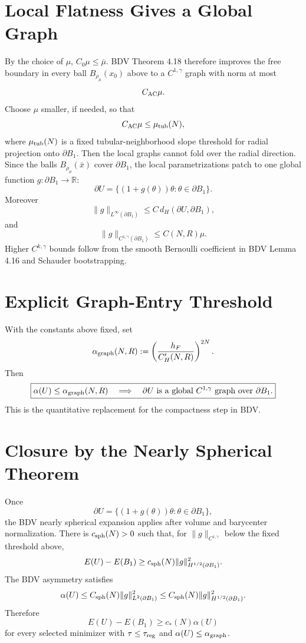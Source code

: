 \documentclass[11pt]{article}
\begin{document}
\section{Local Flatness Gives a Global Graph}

By the choice of \(\mu\), \(C_0\mu\le\bar\mu\). BDV Theorem 4.18 therefore
improves the free boundary in every ball \(B_{\rho_\mu}(x_0)\) above to a
\(C^{1,\gamma}\) graph with norm at most
\[
C_{\rm AC}\mu.
\]
Choose \(\mu\) smaller, if needed, so that
\[
C_{\rm AC}\mu\le \mu_{\rm tub}(N),
\]
where \(\mu_{\rm tub}(N)\) is a fixed tubular-neighborhood slope threshold for
radial projection onto \(\partial B_1\). Then the local graphs cannot fold over
the radial direction. Since the balls \(B_{\rho_\mu}(\bar x)\) cover
\(\partial B_1\), the local parametrizations patch to one global function
\(g:\partial B_1\to\mathbb R\):
\[
\partial U=\{(1+g(\theta))\theta:\theta\in\partial B_1\}.
\]
Moreover
\[
\|g\|_{L^\infty(\partial B_1)}
\le C\,d_H(\partial U,\partial B_1),
\]
and
\[
\|g\|_{C^{1,\gamma}(\partial B_1)}
\le C(N,R)\mu.
\]
Higher \(C^{k,\gamma}\) bounds follow from the smooth Bernoulli coefficient in
BDV Lemma 4.16 and Schauder bootstrapping.

\section{Explicit Graph-Entry Threshold}

With the constants above fixed, set
\[
\alpha_{\rm graph}(N,R)
:=
\left(\frac{h_F}{C_H'(N,R)}\right)^{2N}.
\]
Then
\[
\boxed{
\alpha(U)\le\alpha_{\rm graph}(N,R)
\quad\Longrightarrow\quad
\partial U\hbox{ is a global }C^{1,\gamma}\hbox{ graph over }\partial B_1.
}
\]
This is the quantitative replacement for the compactness step in BDV.

\section{Closure by the Nearly Spherical Theorem}

Once
\[
\partial U=\{(1+g(\theta))\theta:\theta\in\partial B_1\},
\]
the BDV nearly spherical expansion applies after volume and barycenter
normalization. There is \(c_{\rm sph}(N)>0\) such that, for
\(\|g\|_{C^{1,\gamma}}\) below the fixed threshold above,
\[
E(U)-E(B_1)
\ge c_{\rm sph}(N)\|g\|_{H^{1/2}(\partial B_1)}^2.
\]
The BDV asymmetry satisfies
\[
\alpha(U)\le C_{\rm sph}(N)\|g\|_{L^2(\partial B_1)}^2
\le C_{\rm sph}(N)\|g\|_{H^{1/2}(\partial B_1)}^2.
\]
Therefore
\[
\boxed{
E(U)-E(B_1)\ge c_*(N)\alpha(U)
}
\]
for every selected minimizer with
\(\tau\le\tau_{\rm reg}\) and \(\alpha(U)\le\alpha_{\rm graph}\).
\end{document}
